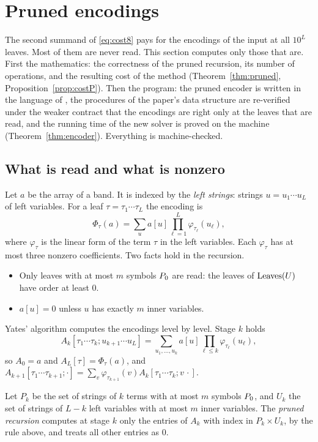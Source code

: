 \section{Pruned encodings}
\label{sec:pruned}

The second summand of \eqref{eq:cost8} pays for the encodings of the input at
all \(10^{L}\) leaves.  Most of them are never read.  This section computes
only those that are.  First the mathematics: the correctness of the pruned
recursion, its number of operations, and the resulting cost of the method
(Theorem~\ref{thm:pruned}, Proposition~\ref{prop:costP}).  Then the program:
the pruned encoder is written in the language of \cite{upstream}, the
procedures of the paper's data structure are re-verified under the weaker
contract that the encodings are right only at the leaves that are read, and
the running time of the new solver is proved on the machine
(Theorem~\ref{thm:encoder}).  Everything is machine-checked.

\subsection{What is read and what is nonzero}

Let \(a\) be the array of a band.  It is indexed by the \emph{left strings}:
strings \(u=u_1\cdots u_L\) of left variables.  For a leaf
\(\tau=\tau_1\cdots\tau_L\) the encoding is
\[
  \Phi_\tau(a)=\sum_u a[u]\prod_{\ell=1}^{L}\varphi_{\tau_\ell}(u_\ell),
\]
where \(\varphi_\tau\) is the linear form of the term \(\tau\) in the left
variables.  Each \(\varphi_\tau\) has at most three nonzero coefficients.  Two
facts hold in the recursion.
\begin{itemize}
\item Only leaves with at most \(m\) symbols \(P_{0}\) are read: the leaves of
  \(\operatorname{Leaves}(U)\) have order at least \(0\).
\item \(a[u]=0\) unless \(u\) has exactly \(m\) inner variables.
\end{itemize}

Yates' algorithm computes the encodings level by level.  Stage \(k\) holds
\[
  A_k[\tau_1\cdots\tau_k;u_{k+1}\cdots u_L]
  =\sum_{u_1,\dots,u_k}a[u]\prod_{\ell\le k}\varphi_{\tau_\ell}(u_\ell),
\]
so \(A_0=a\) and \(A_L[\tau]=\Phi_\tau(a)\), and
\(A_{k+1}[\tau_1\cdots\tau_{k+1};\cdot]
=\sum_v\varphi_{\tau_{k+1}}(v)A_k[\tau_1\cdots\tau_k;v\,\cdot]\).

\begin{definition}\label{def:pruned}
Let \(P_k\) be the set of strings of \(k\) terms with at most \(m\) symbols
\(P_{0}\), and \(U_k\) the set of strings of \(L-k\) left variables with at most
\(m\) inner variables.  The \emph{pruned recursion} computes at stage \(k\)
only the entries of \(A_k\) with index in \(P_k\times U_k\), by the rule above,
and treats all other entries as \(0\).
\end{definition}


